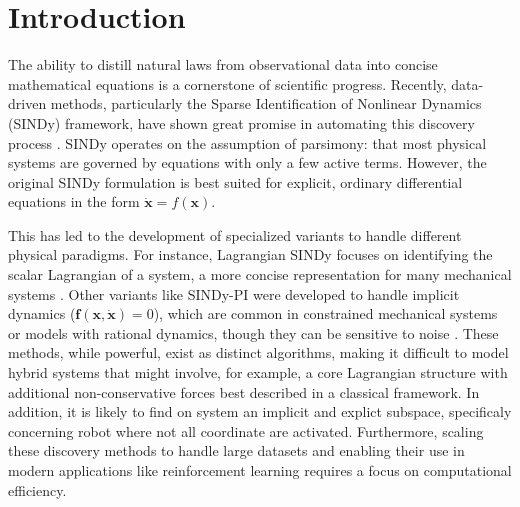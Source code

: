 \documentclass[12pt]{article}
\begin{document}
\section*{Introduction}

\noindent
The ability to distill natural laws from observational data into concise mathematical equations is a cornerstone of scientific progress. Recently, data-driven methods, particularly the Sparse Identification of Nonlinear Dynamics (SINDy) framework, have shown great promise in automating this discovery process \cite{Brunton2016_SINDy}. SINDy operates on the assumption of parsimony: that most physical systems are governed by equations with only a few active terms. However, the original SINDy formulation is best suited for explicit, ordinary differential equations in the form $\dot{\mathbf{x}} = f(\mathbf{x})$.

This has led to the development of specialized variants to handle different physical paradigms. For instance, Lagrangian SINDy focuses on identifying the scalar Lagrangian of a system, a more concise representation for many mechanical systems \cite{Chu2020_LagrangianSINDy, Purnomo2023_xLSINDy}. Other variants like SINDy-PI were developed to handle implicit dynamics ($\mathbf{f}(\mathbf{x}, \dot{\mathbf{x}}) = 0$), which are common in constrained mechanical systems or models with rational dynamics, though they can be sensitive to noise \cite{Kaheman2020_SINDyPI}. These methods, while powerful, exist as distinct algorithms, making it difficult to model hybrid systems that might involve, for example, a core Lagrangian structure with additional non-conservative forces best described in a classical framework. In addition, it is likely to find on system an implicit and explict subspace, specificaly concerning robot where not all coordinate are activated. Furthermore, scaling these discovery methods to handle large datasets and enabling their use in modern applications like reinforcement learning requires a focus on computational efficiency.
\end{document}
